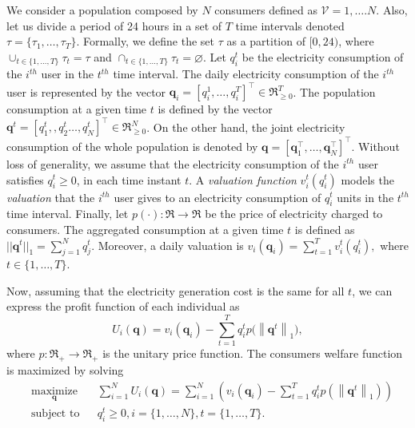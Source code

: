 \documentclass[a4paper,10pt]{article}
\def\th{^{th}}
\newcommand{\bs}[1]{\boldsymbol{#1}}
\def\th{^{th}}
\newcommand{\norm}[1]{\left\lVert#1\right\rVert}
\begin{document}
We consider a population composed by $N$ consumers defined as $\mathcal{V} = {1,\ldots.N}$. Also, let us divide a period of 24 hours in a set of $T$ time intervals denoted $\tau = \{\tau_1,\ldots,\tau_T\}$.
Formally, we define the set $\tau$ as a partition of $[0,24)$, where 
 $\cup_{t\in\{1,\ldots,T\}} \tau_t = \tau$ and $\cap_{t\in\{1,\ldots,T\}} \tau_t = \varnothing$.
%
Let $q_i^t$ be the electricity consumption of the $i\th$ user in the $t\th$ time interval. 
The daily electricity consumption of the $i\th$ user is represented by the vector $\bs{q}_i=[q_i^1,\ldots,q_i^T]^\top\in \Re_{\geq 0}^{T}$.
The population consumption at a given time $t$ is defined by the vector $\bs{q}^t = [q_1^t,, q_2^t\ldots,q_N^t]^\top\in \Re_{\geq 0}^{N}$.
On the other hand, the joint electricity consumption of the whole population is denoted by $\bs{q} = [\bs{q}_1^\top,
\ldots, \bs{q}_N^\top]^\top$. 
Without loss of generality, we assume that the electricity consumption of the $i\th$ user  satisfies $q_i^t\geq 0$,  in each time instant $t$.
A \emph{valuation function} $v_i^t(q_i^t)$ models the \emph{valuation} that the $i\th$ user gives to an electricity consumption of $q_i^t$ units in the $t\th$ time interval. Finally, let $p(\cdot):\Re\rightarrow\Re$ be the price of electricity charged to consumers. The aggregated consumption at a given time $t$ is defined as $||\bs{q}^t||_1 = \sum_{j=1}^N q_j^t$.
Moreover, a daily valuation is 
$v_i(\bs{q}_i)=\sum_{t=1}^T v_i^t(q_i^t),$
 where $t\in\{1,\ldots,T\}$.


 
 
 
Now, assuming  that the electricity generation cost is  the same for all $t$, we can express the profit function of each individual as
%
\begin{equation}\label{eq:u_i_}
 U_i(\bs{q}) = v_i(\bs{q}_i) - \sum_{t=1}^T q_i^t p\Big( \norm{\bs{q}^t}_1 \Big),
\end{equation}
%
where 
$p:\Re_+ \to \Re_+$ is the unitary price function.
The consumers welfare function is maximized by solving \cite{Johari09}
%
\begin{equation}\label{eq:opt_problem}
\begin{aligned}
& \underset{\bs{q}}{\text{maximize}}
& &  \sum_{i=1}^N U_i(\bs{q}) =  \sum_{i=1}^N\left( v_i(\bs{q}_i) - \sum_{t=1}^T q_i^t p\left( \norm{\bs{q}^t}_1 \right) \right) \\
& \text{subject to}
& & q_i^t \geq 0,  i =\{1,\ldots,N\}, t =\{1,\ldots,T\}.
\end{aligned}
\end{equation}
\end{document}
